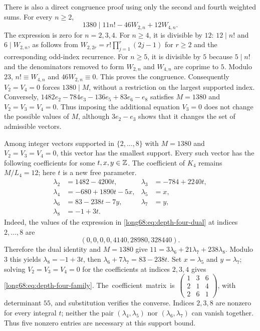 \documentclass[11pt]{article}
\begin{document}
There is also a direct congruence proof using only the second and
fourth weighted sums. For every $n\ge2$,
\begin{equation}
1380\mid 11n!-46W_{2,n}+12W_{4,n}.
\label{long68:eq:depth-four-dual}
\end{equation}
The expression is zero for $n=2,3,4$. For $n\ge4$, it is divisible
by $12$: $12\mid n!$ and $6\mid W_{2,n}$, as follows from
$W_{2,2r}=r!\prod_{j=1}^r(2j-1)$ for $r\ge2$ and the corresponding
odd-index recurrence. For $n\ge5$, it is divisible by $5$ because
$5\mid n!$ and the denominators removed to form $W_{2,n}$ and
$W_{4,n}$ are coprime to $5$. Modulo $23$,
$n!\equiv W_{4,n}$ and $46W_{2,n}\equiv0$. This proves the congruence.
Consequently $V_2=V_4=0$ forces $1380\mid M$, without a restriction
on the largest supported index. Conversely,
$1482e_2-784e_3-136e_5+83e_6-e_8$ satisfies $M=1380$ and
$V_2=V_3=V_4=0$. Thus imposing the additional equation $V_3=0$ does not change the
possible values of $M$, although $3e_2-e_3$ shows that it changes the set of
admissible vectors.

Among integer vectors supported in $\{2,\ldots,8\}$ with $M=1380$ and
$V_2=V_3=V_4=0$, this vector has the smallest support. Every such vector
has the following coefficients for some $t,x,y\in\mathbb{Z}$. The coefficient
of $K_4$ remains $M/L_4=12$; here $t$ is a new free parameter.
\begin{equation}
\begin{aligned}
\lambda_2&=1482-4200t,&\lambda_3&=-784+2240t,\\
\lambda_4&=-680+1890t-5x,&\lambda_5&=x,\\
\lambda_6&=83-238t-7y,&\lambda_7&=y,\\
\lambda_8&=-1+3t.
\end{aligned}
\label{long68:eq:depth-four-family}
\end{equation}
Indeed, the values of the expression in
\eqref{long68:eq:depth-four-dual} at indices $2,\ldots,8$ are
\[
(0,0,0,0,4140,28980,328440).
\]
Therefore the dual identity and
$M=1380$ give $11=3\lambda_6+21\lambda_7+238\lambda_8$.
Modulo $3$ this yields $\lambda_8=-1+3t$, then
$\lambda_6+7\lambda_7=83-238t$. Set $x=\lambda_5$ and
$y=\lambda_7$; solving $V_2=V_3=V_4=0$ for the coefficients at indices
$2,3,4$ gives \eqref{long68:eq:depth-four-family}. The~coefficient~matrix~is~$\left(\begin{smallmatrix}1&3&6\\2&1&4\\2&6&1\end{smallmatrix}\right)$,
with determinant $55$, and substitution verifies the converse.
Indices $2,3,8$ are nonzero for every integral $t$; neither the pair
$(\lambda_4,\lambda_5)$ nor $(\lambda_6,\lambda_7)$ can vanish
together. Thus five nonzero entries are necessary at this support bound.
\end{document}
